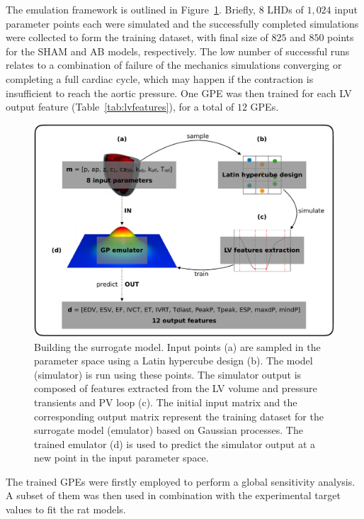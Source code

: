 \vspace{0.2cm}
The emulation framework is outlined in Figure~\ref{fig:emulatorframework}. Briefly, $8$ LHDs of $1,024$ input parameter points each were simulated and the successfully completed simulations were collected to form the training dataset, with final size of $825$ and $850$ points for the SHAM and AB models, respectively. The low number of successful runs relates to a combination of failure of the mechanics simulations converging or completing a full cardiac cycle, which may happen if the contraction is insufficient to reach the aortic pressure. One GPE was then trained for each LV output feature (Table~\ref{tab:lvfeatures}), for a total of $12$ GPEs. 

\begin{figure}[!ht]
    \myfloatalign
    \includegraphics[width=\textwidth]{figures/chapter04/emulator_framework.pdf}
    \caption{Building the surrogate model. Input points (a) are sampled in the parameter space using a Latin hypercube design (b). The model (simulator) is run using these points. The simulator output is composed of features extracted from the LV volume and pressure transients and PV loop (c). The initial input matrix and the corresponding output matrix represent the training dataset for the surrogate model (emulator) based on Gaussian processes. The trained emulator (d) is used to predict the simulator output at a new point in the input parameter space. }
    \label{fig:emulatorframework}
\end{figure}

\vspace{0.2cm}
The trained GPEs were firstly employed to perform a global sensitivity analysis. A subset of them was then used in combination with the experimental target values to fit the rat models.


